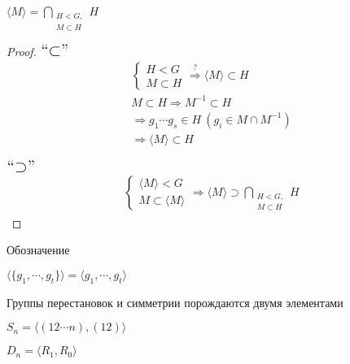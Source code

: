 \begin{theorem-non}
$\langle M \rangle = \bigcap\limits_{\substack{H < G, \\ M \subset H}} H $

\begin{proof} \quad

    $\mbox{\Large``$\subset$''}$
    \begin{gather*}
        \begin{cases}
        H < G \\
        M \subset H
        \end{cases}
        \stackrel{?}{\Longrightarrow} \langle M \rangle \subset H \\
        M \subset H \Longrightarrow M^{-1} \subset H \\
        \Longrightarrow g_1 \cdots g_s \in H\ (g_i\in M \cap M^{-1}) \\
        \Longrightarrow \langle M \rangle \subset H
    \end{gather*}

    $\mbox{\Large``$\supset$''}$
    \begin{gather*}
        \begin{cases}
        \langle M \rangle < G \\
        M \subset \langle M \rangle
        \end{cases}
        \Longrightarrow \langle M \rangle \supset \bigcap\limits_{\substack{H < G, \\ M \subset H}} H
    \end{gather*}

    \end{proof}
\end{theorem-non}

\notice Обозначение

$\langle \{ g_1, \cdots, g_t \} \rangle = \langle g_1, \cdots, g_t \rangle$

\notice Группы перестановок и симметрии порождаются двумя элементами

$S_n = \langle (1 2 \cdots n), (12) \rangle$

$D_n = \langle R_1, R_0 \rangle $